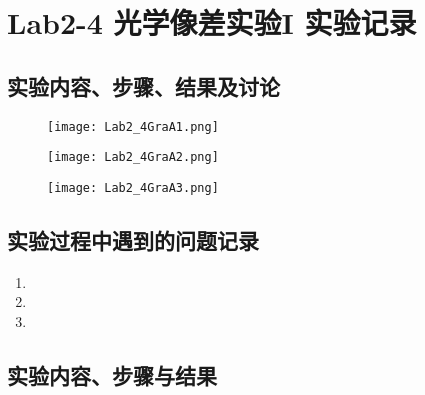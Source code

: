 \documentclass[dvipsnames, svgnames,a4paper,11pt]{article}
\begin{document}
	\section{Lab2-4 光学像差实验I  \quad\heiti 实验记录}
	
	\subsection{实验内容、步骤、结果及讨论}
	
	\begin{figure}[htbp]
		\centering
		\texttt{[image: Lab2\_4GraA1.png]}
	\end{figure}
	
	
	\clearpage
	\begin{figure}[t]
		\centering
		\texttt{[image: Lab2\_4GraA2.png]}
	\end{figure}
	
	\clearpage
	\begin{figure}[t]
		\centering
		\texttt{[image: Lab2\_4GraA3.png]}
	\end{figure}
	
	\clearpage
	
	\newpage
	
	\null
	
	\newpage
	
	\null
	
	
	
	
	
	
	\newpage
	
	\subsection{实验过程中遇到的问题记录}
	
	\begin{enumerate}
		\item 
		\item 
		\item 
	\end{enumerate}
	\null
	
	
	
	
	
	
	
	
	
	
	
	
	
	
	
	
	\subsection{实验内容、步骤与结果}
	
\end{document}
